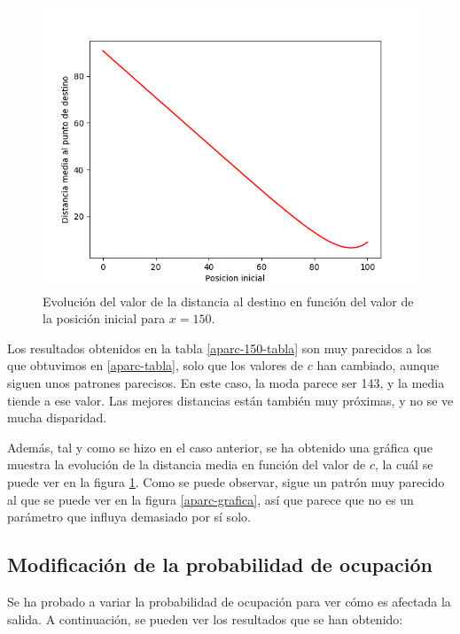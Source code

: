 \documentclass[11pt,a4paper]{report}
\begin{document}
\begin{figure}[H]
\centering
\includegraphics[scale=0.47]{img/c-dist.png}
\caption{Evolución del valor de la distancia al destino en función del valor de la posición inicial para $x = 150$.}
\label{aparc-150-grafica}
\end{figure}

Los resultados obtenidos en la tabla \ref{aparc-150-tabla} son muy parecidos a los que obtuvimos en \ref{aparc-tabla},
solo que los valores de $c$ han cambiado, aunque siguen unos patrones parecisos. En este caso, la moda parece ser 143,
y la media tiende a ese valor. Las mejores distancias están también muy próximas, y no se ve mucha disparidad.

Además, tal y como se hizo en el caso anterior, se ha obtenido una gráfica que muestra la evolución de la distancia media
en función del valor de $c$, la cuál se puede ver en la figura \ref{aparc-150-grafica}. Como se puede observar, sigue
un patrón muy parecido al que se puede ver en la figura \ref{aparc-grafica}, así que parece que no es un parámetro
que influya demasiado por sí solo.

\subsection{Modificación de la probabilidad de ocupación}

Se ha probado a variar la probabilidad de ocupación para ver cómo es afectada la salida. A continuación, se pueden ver
los resultados que se han obtenido:
\end{document}
